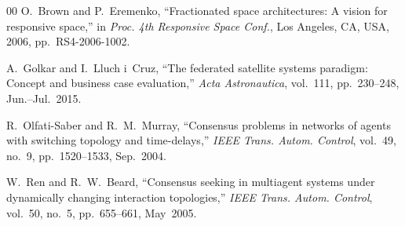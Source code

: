 \documentclass[journal]{IEEEtran}
\begin{document}
\begin{thebibliography}{00}
O.~Brown and P.~Eremenko, ``Fractionated space architectures: A vision for responsive space,'' in \emph{Proc. 4th Responsive Space Conf.}, Los Angeles, CA, USA, 2006, pp.~RS4-2006-1002.

A.~Golkar and I.~Lluch i~Cruz, ``The federated satellite systems paradigm: Concept and business case evaluation,'' \emph{Acta Astronautica}, vol.~111, pp.~230--248, Jun.--Jul.~2015.

R.~Olfati-Saber and R.~M.~Murray, ``Consensus problems in networks of agents with switching topology and time-delays,'' \emph{IEEE Trans. Autom. Control}, vol.~49, no.~9, pp.~1520--1533, Sep.~2004.

W.~Ren and R.~W.~Beard, ``Consensus seeking in multiagent systems under dynamically changing interaction topologies,'' \emph{IEEE Trans. Autom. Control}, vol.~50, no.~5, pp.~655--661, May~2005.

\end{thebibliography}
\end{document}
